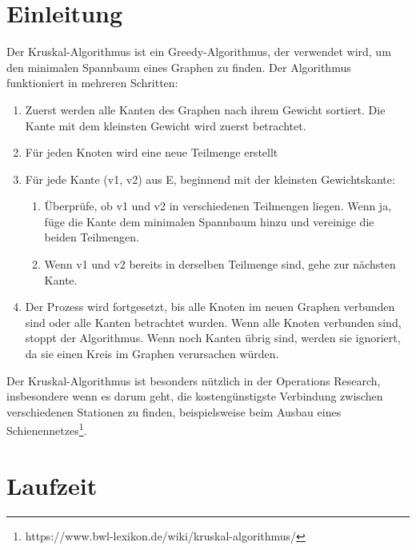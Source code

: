 \documentclass[a4paper]{article}
\begin{document}
	

\newpage

\tableofcontents

\section{Einleitung}

Der Kruskal-Algorithmus ist ein Greedy-Algorithmus, der verwendet wird, um den minimalen Spannbaum eines Graphen zu finden. Der Algorithmus funktioniert in mehreren Schritten:

\begin{enumerate}
    \item Zuerst werden alle Kanten des Graphen nach ihrem Gewicht sortiert. Die Kante mit dem kleinsten Gewicht wird zuerst betrachtet. 

    \item Für jeden Knoten wird eine neue Teilmenge erstellt
    
    \item Für jede Kante (v1, v2) aus E, beginnend mit der kleinsten Gewichtskante:
    
        \begin{enumerate}
            \item Überprüfe, ob v1 und v2 in verschiedenen Teilmengen liegen. Wenn ja, füge die Kante dem minimalen Spannbaum hinzu und vereinige die beiden Teilmengen.
            \item Wenn v1 und v2 bereits in derselben Teilmenge sind, gehe zur nächsten Kante.
        \end{enumerate}
    
     \item Der Prozess wird fortgesetzt, bis alle Knoten im neuen Graphen verbunden sind oder alle Kanten betrachtet wurden. Wenn alle Knoten verbunden sind, stoppt der Algorithmus. Wenn noch Kanten übrig sind, werden sie ignoriert, da sie einen Kreis im Graphen verursachen würden.
\end{enumerate}

Der Kruskal-Algorithmus ist besonders nützlich in der Operations Research, insbesondere wenn es darum geht, die kostengünstigste Verbindung zwischen verschiedenen Stationen zu finden, beispielsweise beim Ausbau eines Schienennetzes\footnote{https://www.bwl-lexikon.de/wiki/kruskal-algorithmus/}. \\

\section{Laufzeit}
\end{document}
